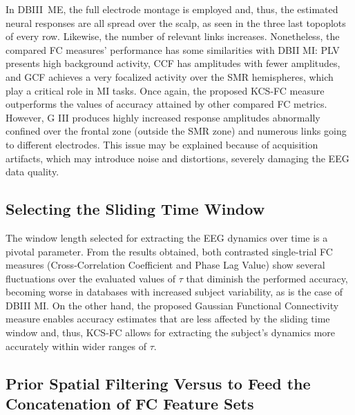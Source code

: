 In DBIII~ME, the full electrode montage is employed and, thus, the estimated neural responses are all spread over the scalp, as seen in the three last topoplots of every row. Likewise, the number of relevant links increases. Nonetheless, the compared FC measures' performance has some similarities with DBII MI: PLV presents high background activity, CCF has amplitudes with fewer amplitudes, and GCF achieves a very focalized activity over the SMR hemispheres, which play a critical role in MI tasks. Once again, the proposed KCS-FC measure outperforms the values of accuracy attained by other compared FC metrics. However, G III produces highly increased response amplitudes abnormally confined over the frontal zone (outside the SMR zone) and numerous links going to different electrodes. This issue may be explained because of acquisition artifacts, which may introduce noise and distortions, severely damaging the EEG data quality.

\subsection{Selecting the Sliding Time Window} 

The window length selected for extracting the EEG dynamics over time is a pivotal parameter. From the results obtained, both contrasted single-trial FC measures (Cross-Correlation Coefficient and Phase Lag Value) show several fluctuations over the evaluated values of $\tau$ that diminish the performed accuracy, becoming worse in databases with increased subject variability, as is the case of DBIII MI. On the other hand, the proposed Gaussian Functional Connectivity measure enables accuracy estimates that are less affected by the sliding time window and, thus, KCS-FC allows for extracting the subject's dynamics more accurately within wider ranges of $\tau$. 

\subsection{Prior Spatial Filtering Versus to Feed the Concatenation of FC Feature Sets} 

